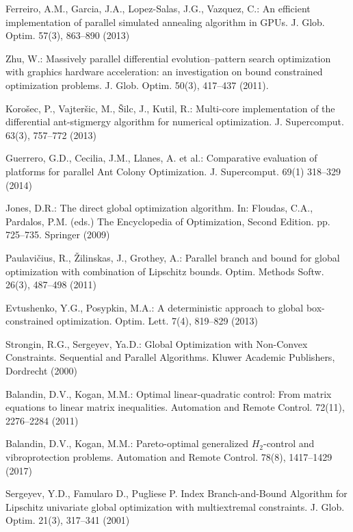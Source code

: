 \documentclass[smallextended]{svjour3}       %
\begin{document}
\begin{thebibliography}{}

Ferreiro, A.M., Garcia, J.A., Lopez-Salas, J.G., Vazquez, C.: An efficient implementation of parallel simulated annealing algorithm in GPUs. J. Glob. Optim. 57(3), 863--890 (2013)

Zhu, W.: Massively parallel differential evolution--pattern search optimization with graphics hardware acceleration: an investigation on bound constrained optimization problems. J. Glob. Optim. 50(3), 417--437 (2011).

Koro\v sec, P., Vajter\v sic, M.,  \v Silc, J., Kutil, R.: Multi-core implementation of the differential ant-stigmergy algorithm for numerical optimization. J. Supercomput. 63(3), 757--772 (2013)

Guerrero, G.D., Cecilia, J.M., Llanes, A. et al.: Comparative evaluation of platforms for parallel Ant Colony Optimization. J. Supercomput. 69(1) 318--329 (2014)

Jones, D.R.: The direct global optimization algorithm. In: Floudas, C.A., Pardalos, P.M. (eds.) The Encyclopedia of Optimization, Second Edition. pp. 725--735. Springer (2009)

Paulavi\v cius, R., \v Zilinskas, J., Grothey, A.: Parallel branch and bound for global optimization with combination of Lipschitz bounds. Optim. Methods Softw. 26(3), 487--498 (2011)

Evtushenko, Y.G., Posypkin, M.A.: A deterministic approach to global box-constrained optimization. Optim. Lett. 7(4), 819--829 (2013)

Strongin, R.G., Sergeyev, Ya.D.: Global Optimization with Non-Convex Constraints. Sequential and Parallel Algorithms. Kluwer Academic Publishers, Dordrecht (2000)


Balandin, D.V., Kogan, M.M.: Optimal linear-quadratic control: From matrix equations to linear matrix inequalities. Automation and Remote Control. 72(11), 2276--2284 (2011)

Balandin, D.V., Kogan, M.M.: Pareto-optimal generalized $H_2$-control and vibroprotection problems. Automation and Remote Control. 78(8), 1417--1429 (2017)


Sergeyev, Y.D., Famularo D., Pugliese P. Index Branch-and-Bound Algorithm for Lipschitz univariate global optimization with multiextremal constraints. J. Glob. Optim. 21(3), 317--341 (2001) 


\end{thebibliography}
\end{document}
